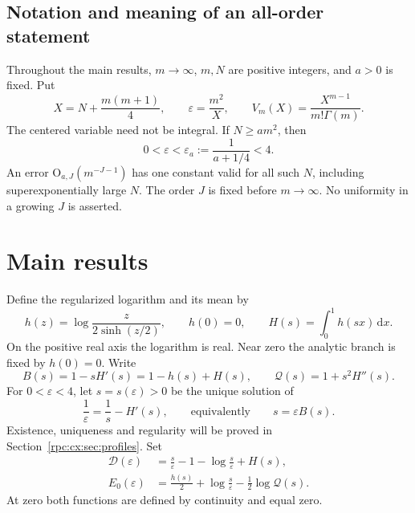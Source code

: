 \documentclass[11pt]{article}
\theoremstyle{definition}
\theoremstyle{remark}
\newcommand{\dd}{\,\mathrm d}
\numberwithin{equation}{section}
\begin{document}
\subsection{Notation and meaning of an all-order statement}
Throughout the main results, $m\to\infty$, $m,N$ are positive integers,
and $a>0$ is fixed. Put
\begin{equation}\label{rpc:cx:eq:center}
 X=N+\frac{m(m+1)}4,\qquad
 \varepsilon=\frac{m^2}{X},\qquad
 V_m(X)=\frac{X^{m-1}}{m!\Gamma(m)}.
\end{equation}
The centered variable need not be integral. If $N\ge am^2$, then
\begin{equation}\label{rpc:cx:eq:epsrange}
 0<\varepsilon<\varepsilon_a:=\frac1{a+1/4}<4.
\end{equation}
An error $\mathrm O_{a,J}(m^{-J-1})$ has one constant valid for all such $N$,
including superexponentially large $N$. The order $J$ is fixed before
$m\to\infty$. No uniformity in a growing $J$ is asserted.

\section{Main results}\label{rpc:cx:sec:main}
Define the regularized logarithm and its mean by
\begin{equation}\label{rpc:cx:eq:hH}
 h(z)=\log\frac{z}{2\sinh(z/2)},\qquad h(0)=0,
 \qquad H(s)=\int_0^1h(sx)\dd x.
\end{equation}
On the positive real axis the logarithm is real. Near zero the analytic
branch is fixed by $h(0)=0$. Write
\begin{equation}\label{rpc:cx:eq:Bq}
 B(s)=1-sH'(s)=1-h(s)+H(s),\qquad
 \mathcal Q(s)=1+s^2H''(s).
\end{equation}
For $0<\varepsilon<4$, let $s=s(\varepsilon)>0$ be the unique solution of
\begin{equation}\label{rpc:cx:eq:continuum-saddle}
 \frac1\varepsilon=\frac1s-H'(s),\qquad\text{equivalently}\qquad
 s=\varepsilon B(s).
\end{equation}
Existence, uniqueness and regularity will be proved in
Section~\ref{rpc:cx:sec:profiles}. Set
\begin{align}
 \mathcal D(\varepsilon)&=\frac{s}{\varepsilon}-1-\log\frac{s}{\varepsilon}+H(s),
       \label{rpc:cx:eq:D}\\
 E_0(\varepsilon)&=\frac{h(s)}2+\log\frac{s}{\varepsilon}-\frac12\log \mathcal Q(s).
       \label{rpc:cx:eq:E0}
\end{align}
At zero both functions are defined by continuity and equal zero.
\end{document}
